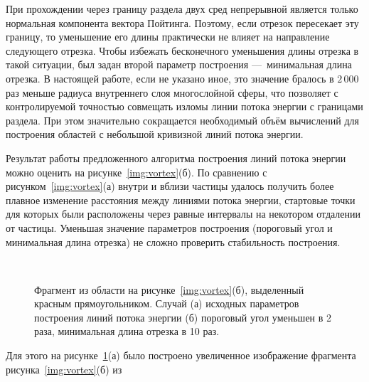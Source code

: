 При прохождении через границу раздела двух сред непрерывной является
только нормальная компонента вектора Пойтинга. Поэтому, если отрезок
пересекает эту границу, то уменьшение его длины практически не влияет
на направление следующего отрезка. Чтобы избежать бесконечного
уменьшения длины отрезка в такой ситуации, был задан второй параметр
построения ---~минимальная длина отрезка.  В настоящей работе, если не
указано иное, это значение бралось в $2\,000$ раз меньше радиуса
внутреннего слоя многослойной сферы, что позволяет с контролируемой
точностью совмещать изломы линии потока энергии с границами
раздела. При этом значительно сокращается необходимый объём вычислений
для построения областей с небольшой кривизной линий потока энергии.

Результат работы предложенного алгоритма построения линий потока
энергии можно оценить на рисунке~\ref{img:vortex}(б).  По сравнению с
рисунком~\ref{img:vortex}(а) внутри и вблизи частицы удалось получить
более плавное изменение расстояния между линиями потока энергии,
стартовые точки для которых были расположены через равные интервалы на
некотором отдалении от частицы.  Уменьшая значение параметров
построения (пороговый угол и минимальная длина отрезка) не сложно
проверить стабильность построения.
\begin{figure}[t] 
{\center
  \begin{minipage}[ht]{0.49\linewidth}        
  \end{minipage}
  \begin{minipage}[ht]{0.49\linewidth}
  \end{minipage}
}\\
{\center
  \begin{minipage}[ht]{0.49\linewidth}        
  \end{minipage}
  \begin{minipage}[ht]{0.49\linewidth}
  \end{minipage}
}
  \caption{Фрагмент из области на рисунке~\ref{img:vortex}(б),
    выделенный красным прямоугольником. Случай (а) исходных параметров построения
    линий потока энергии (б) пороговый угол уменьшен в 2 раза,
    минимальная длина отрезка в 10 раз.\label{img:vortex-crop}}
\end{figure}
Для этого на рисунке~\ref{img:vortex-crop}(а) было построено
увеличенное изображение фрагмента рисунка~\ref{img:vortex}(б) из
